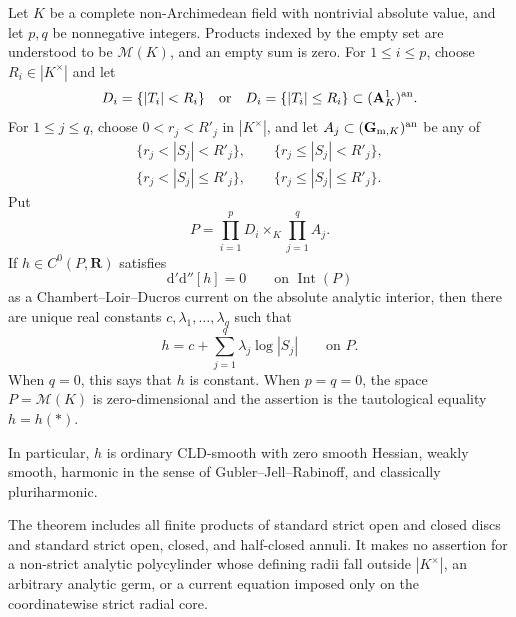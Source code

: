 \begin{theorem}\label{thm:p062-endpoint-polycylinder-v4-research}
Let \(K\) be a complete non-Archimedean field with nontrivial absolute
value, and let \(p,q\) be nonnegative integers.  Products indexed by the
empty set are understood to be \(\mathcal M(K)\), and an empty sum is zero.
For \(1\leq i\leq p\), choose \(R_i\in|K^\times|\) and let
\[
 D_i=\{|T_i|<R_i\}
       \quad\text{or}\quad
 D_i=\{|T_i|\leq R_i\}
       \subset (\mathbf A^1_K)^{\mathrm{an}}.
\]
For \(1\leq j\leq q\), choose
\(
 0<r_j<R'_j
\)
in \(|K^\times|\), and let \(A_j\subset(\mathbf G_{\mathrm m,K})^{\mathrm{an}}\)
be any of
\[
\begin{gathered}
 \{r_j<|S_j|<R'_j\},\qquad
 \{r_j\leq|S_j|<R'_j\},\\
 \{r_j<|S_j|\leq R'_j\},\qquad
 \{r_j\leq|S_j|\leq R'_j\}.
\end{gathered}
\]
Put
\begin{equation}\label{eq:p062-endpoint-polycylinder-domain-v4-research}
             P=\prod_{i=1}^pD_i\times_K\prod_{j=1}^qA_j.
\end{equation}
If \(h\in C^0(P,\mathbf R)\) satisfies
\begin{equation}\label{eq:p062-endpoint-polycylinder-current-v4-research}
              \mathrm d'\mathrm d''[h]=0
              \qquad\text{on }\operatorname{Int}(P)
\end{equation}
as a Chambert--Loir--Ducros current on the absolute analytic interior,
then there are unique real constants
\(c,\lambda_1,\ldots,\lambda_q\) such that
\begin{equation}\label{eq:p062-endpoint-polycylinder-affine-v4-research}
                  h=c+\sum_{j=1}^q\lambda_j\log|S_j|
                  \qquad\text{on }P.
\end{equation}
When \(q=0\), this says that \(h\) is constant.  When \(p=q=0\), the
space \(P=\mathcal M(K)\) is zero-dimensional and the assertion is the
tautological equality \(h=h(*)\).

In particular, \(h\) is ordinary CLD-smooth with zero smooth Hessian,
weakly smooth, harmonic in the sense of Gubler--Jell--Rabinoff, and
classically pluriharmonic.

The theorem includes all finite products of standard strict open and closed
discs and standard strict open, closed, and half-closed annuli.  It makes no
assertion for a non-strict analytic polycylinder whose defining radii fall
outside \(|K^\times|\), an arbitrary analytic germ, or a current equation
imposed only on the coordinatewise strict radial core.
\end{theorem}
